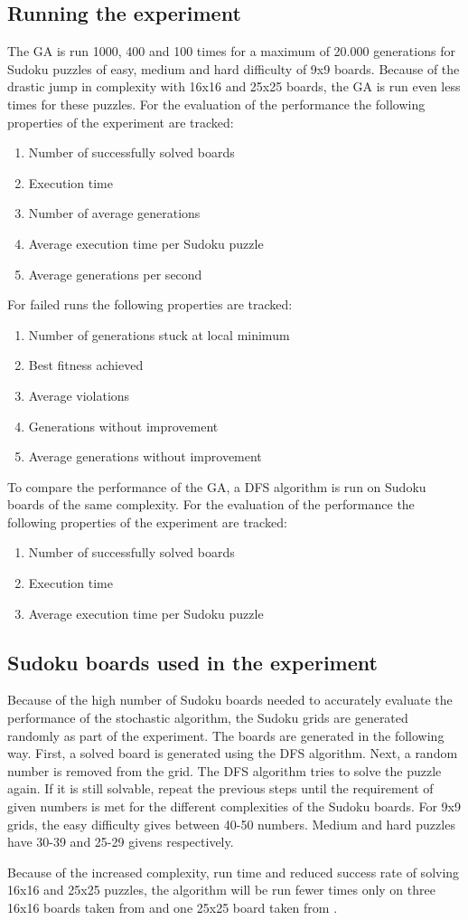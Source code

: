\subsection{Running the experiment}
The GA is run 1000, 400 and 100 times for a maximum of 20.000 generations for Sudoku puzzles of easy, medium and hard difficulty of 9x9 boards. Because of the drastic jump in complexity with 16x16 and 25x25 boards, the GA is run even less times for these puzzles. For the evaluation of the performance the following properties of the experiment are tracked:
\begin{enumerate}
	\item Number of successfully solved boards
	\item Execution time
	\item Number of average generations
	\item Average execution time per Sudoku puzzle
	\item Average generations per second
\end{enumerate}

For failed runs the following properties are tracked:
\begin{enumerate}
	\item Number of generations stuck at local minimum
	\item Best fitness achieved
	\item Average violations
	\item Generations without improvement
	\item Average generations without improvement
\end{enumerate}

To compare the performance of the GA, a DFS algorithm is run on Sudoku boards of the same complexity. For the evaluation of the performance the following properties of the experiment are tracked:
\begin{enumerate}
	\item Number of successfully solved boards
	\item Execution time
	\item Average execution time per Sudoku puzzle
\end{enumerate}

\subsection{Sudoku boards used in the experiment}
Because of the high number of Sudoku boards needed to accurately evaluate the performance of the stochastic algorithm, the Sudoku grids are generated randomly as part of the experiment. The boards are generated in the following way. 
First, a solved board is generated using the DFS algorithm. Next, a random number is removed from the grid. The DFS algorithm tries to solve the puzzle again. If it is still solvable, repeat the previous steps until the requirement of given numbers is met for the different complexities of the Sudoku boards. For 9x9 grids, the easy difficulty gives between 40-50 numbers. Medium and hard puzzles have 30-39 and 25-29 givens respectively.

Because of the increased complexity, run time and reduced success rate of solving 16x16 and 25x25 puzzles, the algorithm will be run fewer times only on three 16x16 boards taken from \cite{Sudoku16} and one 25x25 board taken from \cite{Sudoku25}.